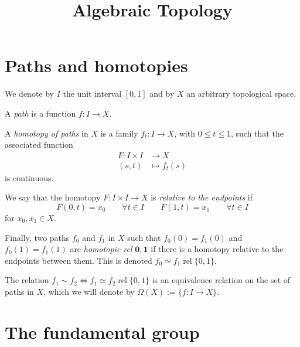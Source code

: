 



\title{Algebraic Topology}
\maketitle

\label{section-phantom}

\tableofcontents

\section{Paths and homotopies}
\label{section-paths-homotopies}

We denote by $I$ the unit interval $[0,1]$
and by
$X$ an arbitrary topological space.

\begin{definition}
A \emph{path} is a function $f:I\to X$.
\end{definition}

\begin{definition}
A \emph{homotopy of paths} in $X$ is a family
$f_t:I\to X$, with $0\leq t\leq1$, such that
the
associated function
$$
\begin{aligned}
F:I\times I&\to X\\
(s,t)&\mapsto f_t(s)
\end{aligned}
$$
is continuous.

We say that the homotopy $F:I\times I\to X$
is
\emph{relative to the endpoints} if
$$
F(0,t)=x_0\qquad\forall t\in I
\qquad
F(1,t)=x_1\qquad\forall t\in I
$$
for $x_0,x_1\in X$.

Finally, two paths $f_0$ and $f_1$ in $X$
such that
$f_0(0)=f_1(0)$ and $f_0(1)=f_1(1)$ are
\emph{homotopic rel} $\mathbf{0,1}$ if there
is a
homotopy relative to the endpoints between
them. This is denoted
$f_0\simeq f_1\operatorname{rel}\{0,1\}$.
\end{definition}

\begin{theorem}
The relation
$f_1\sim{}f_2\iff f_1\simeq
f_2\operatorname{rel}\{0,1\}$ is an
equivalence relation on the set of paths in
$X$, which we
will denote by $\Omega(X):=\{f:I\to X\}$.
\end{theorem}
\section{The fundamental group}
\label{section-fundamental-group}

